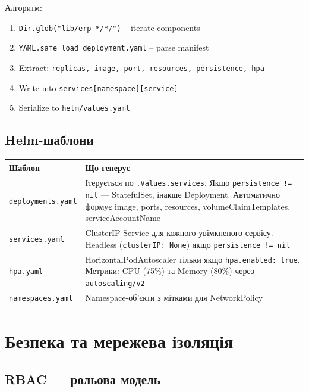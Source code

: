\documentclass[12pt,a4paper]{article}
\begin{document}
Алгоритм:

\begin{enumerate}
\item \texttt{Dir.glob("lib/erp-*/*/")}  -- iterate components
\item \texttt{YAML.safe\_load deployment.yaml} -- parse manifest
\item Extract: \texttt{replicas, image, port, resources, persistence, hpa}
\item Write into \texttt{services[namespace][service]}
\item Serialize to \texttt{helm/values.yaml}
\end{enumerate}

\subsection{Helm-шаблони}

\begin{longtable}{L{4cm} L{10cm}}
\toprule
{}
\color{primary}\textbf{Шаблон} & \color{primary}\textbf{Що генерує} \\
\midrule\endhead\bottomrule\endfoot
\texttt{deployments.yaml}
  & Ітерується по \texttt{.Values.services}. Якщо \texttt{persistence != nil}
    --- StatefulSet, інакше Deployment. Автоматично формує image, ports,
    resources, volumeClaimTemplates, serviceAccountName \\[4pt]
\texttt{services.yaml}
  & ClusterIP Service для кожного увімкненого сервісу.
    Headless (\texttt{clusterIP: None}) якщо \texttt{persistence != nil} \\[4pt]
\texttt{hpa.yaml}
  & HorizontalPodAutoscaler тільки якщо \texttt{hpa.enabled: true}.
    Метрики: CPU (75\%) та Memory (80\%) через \texttt{autoscaling/v2} \\[4pt]
\texttt{namespaces.yaml}
  & Namespace-об'єкти з мітками для NetworkPolicy \\[4pt]
\end{longtable}

\newpage
\section{Безпека та мережева ізоляція}

\subsection{RBAC --- рольова модель}
\end{document}
